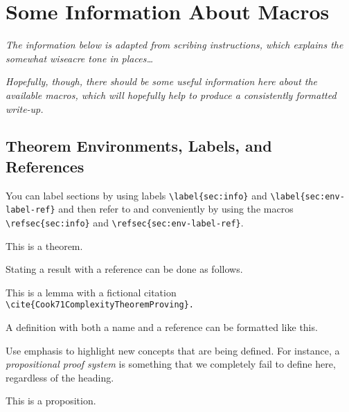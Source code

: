 
\section{Some Information About Macros}
\label{sec:info}

\emph{The information below is adapted from scribing instructions, which
explains the somewhat wiseacre tone in places\ldots}

\emph{Hopefully, though, there should be some useful information here about
the available macros, which will hopefully help to produce a
consistently formatted write-up.}

\subsection{Theorem Environments, Labels, and References}
\label{sec:env-label-ref}

You can label sections by using labels
\verb+\label{sec:info}+
and
\verb+\label{sec:env-label-ref}+
and then refer to
and
conveniently 
by using the macros 
\verb+\refsec{sec:info}+
and
\verb+\refsec{sec:env-label-ref}+.


\begin{theorem}
  \label{th:template-theorem}
  This is a theorem.
\end{theorem}

Stating a result with a reference can be done as follows.

\begin{lemma}
  \label{lem:template-lemma}
  This is a lemma with a fictional citation  
  \verb+\cite{Cook71ComplexityTheoremProving}.+
\end{lemma}

A definition with both a name and a reference can be formatted like this.

\begin{definition}
  \label{def:template-def}
  Use emphasis to highlight new concepts that are being defined. For
  instance, a
  \emph{propositional proof system}
  is something that we completely fail to define here, regardless of
  the heading.
\end{definition}

\begin{proposition}
  \label{pr:template-proposition}
  This is a proposition.
\end{proposition}

